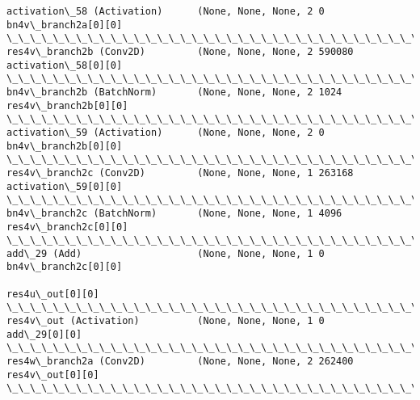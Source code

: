 \documentclass[11pt]{article}
\begin{document}
\begin{Verbatim}[commandchars=\\\{\}]
activation\_58 (Activation)      (None, None, None, 2 0           bn4v\_branch2a[0][0]              
\_\_\_\_\_\_\_\_\_\_\_\_\_\_\_\_\_\_\_\_\_\_\_\_\_\_\_\_\_\_\_\_\_\_\_\_\_\_\_\_\_\_\_\_\_\_\_\_\_\_\_\_\_\_\_\_\_\_\_\_\_\_\_\_\_\_\_\_\_\_\_\_\_\_\_\_\_\_\_\_\_\_\_\_\_\_\_\_\_\_\_\_\_\_\_\_\_\_
res4v\_branch2b (Conv2D)         (None, None, None, 2 590080      activation\_58[0][0]              
\_\_\_\_\_\_\_\_\_\_\_\_\_\_\_\_\_\_\_\_\_\_\_\_\_\_\_\_\_\_\_\_\_\_\_\_\_\_\_\_\_\_\_\_\_\_\_\_\_\_\_\_\_\_\_\_\_\_\_\_\_\_\_\_\_\_\_\_\_\_\_\_\_\_\_\_\_\_\_\_\_\_\_\_\_\_\_\_\_\_\_\_\_\_\_\_\_\_
bn4v\_branch2b (BatchNorm)       (None, None, None, 2 1024        res4v\_branch2b[0][0]             
\_\_\_\_\_\_\_\_\_\_\_\_\_\_\_\_\_\_\_\_\_\_\_\_\_\_\_\_\_\_\_\_\_\_\_\_\_\_\_\_\_\_\_\_\_\_\_\_\_\_\_\_\_\_\_\_\_\_\_\_\_\_\_\_\_\_\_\_\_\_\_\_\_\_\_\_\_\_\_\_\_\_\_\_\_\_\_\_\_\_\_\_\_\_\_\_\_\_
activation\_59 (Activation)      (None, None, None, 2 0           bn4v\_branch2b[0][0]              
\_\_\_\_\_\_\_\_\_\_\_\_\_\_\_\_\_\_\_\_\_\_\_\_\_\_\_\_\_\_\_\_\_\_\_\_\_\_\_\_\_\_\_\_\_\_\_\_\_\_\_\_\_\_\_\_\_\_\_\_\_\_\_\_\_\_\_\_\_\_\_\_\_\_\_\_\_\_\_\_\_\_\_\_\_\_\_\_\_\_\_\_\_\_\_\_\_\_
res4v\_branch2c (Conv2D)         (None, None, None, 1 263168      activation\_59[0][0]              
\_\_\_\_\_\_\_\_\_\_\_\_\_\_\_\_\_\_\_\_\_\_\_\_\_\_\_\_\_\_\_\_\_\_\_\_\_\_\_\_\_\_\_\_\_\_\_\_\_\_\_\_\_\_\_\_\_\_\_\_\_\_\_\_\_\_\_\_\_\_\_\_\_\_\_\_\_\_\_\_\_\_\_\_\_\_\_\_\_\_\_\_\_\_\_\_\_\_
bn4v\_branch2c (BatchNorm)       (None, None, None, 1 4096        res4v\_branch2c[0][0]             
\_\_\_\_\_\_\_\_\_\_\_\_\_\_\_\_\_\_\_\_\_\_\_\_\_\_\_\_\_\_\_\_\_\_\_\_\_\_\_\_\_\_\_\_\_\_\_\_\_\_\_\_\_\_\_\_\_\_\_\_\_\_\_\_\_\_\_\_\_\_\_\_\_\_\_\_\_\_\_\_\_\_\_\_\_\_\_\_\_\_\_\_\_\_\_\_\_\_
add\_29 (Add)                    (None, None, None, 1 0           bn4v\_branch2c[0][0]              
                                                                 res4u\_out[0][0]                  
\_\_\_\_\_\_\_\_\_\_\_\_\_\_\_\_\_\_\_\_\_\_\_\_\_\_\_\_\_\_\_\_\_\_\_\_\_\_\_\_\_\_\_\_\_\_\_\_\_\_\_\_\_\_\_\_\_\_\_\_\_\_\_\_\_\_\_\_\_\_\_\_\_\_\_\_\_\_\_\_\_\_\_\_\_\_\_\_\_\_\_\_\_\_\_\_\_\_
res4v\_out (Activation)          (None, None, None, 1 0           add\_29[0][0]                     
\_\_\_\_\_\_\_\_\_\_\_\_\_\_\_\_\_\_\_\_\_\_\_\_\_\_\_\_\_\_\_\_\_\_\_\_\_\_\_\_\_\_\_\_\_\_\_\_\_\_\_\_\_\_\_\_\_\_\_\_\_\_\_\_\_\_\_\_\_\_\_\_\_\_\_\_\_\_\_\_\_\_\_\_\_\_\_\_\_\_\_\_\_\_\_\_\_\_
res4w\_branch2a (Conv2D)         (None, None, None, 2 262400      res4v\_out[0][0]                  
\_\_\_\_\_\_\_\_\_\_\_\_\_\_\_\_\_\_\_\_\_\_\_\_\_\_\_\_\_\_\_\_\_\_\_\_\_\_\_\_\_\_\_\_\_\_\_\_\_\_\_\_\_\_\_\_\_\_\_\_\_\_\_\_\_\_\_\_\_\_\_\_\_\_\_\_\_\_\_\_\_\_\_\_\_\_\_\_\_\_\_\_\_\_\_\_\_\_

\end{Verbatim}
\end{document}
